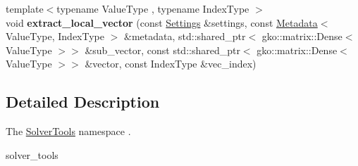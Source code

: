 \begin{DoxyCompactItemize}
\item 
\mbox{\label{namespaceSchwarzWrappers_1_1SolverTools_aaee0d8f44ffb632b4b58dad045c53b57}} 
{\footnotesize template$<$typename Value\+Type , typename Index\+Type $>$ }\\void {\bfseries extract\+\_\+local\+\_\+vector} (const \hyperlink{structSchwarzWrappers_1_1Settings}{Settings} \&settings, const \hyperlink{structSchwarzWrappers_1_1Metadata}{Metadata}$<$ Value\+Type, Index\+Type $>$ \&metadata, std\+::shared\+\_\+ptr$<$ gko\+::matrix\+::\+Dense$<$ Value\+Type $>$$>$ \&sub\+\_\+vector, const std\+::shared\+\_\+ptr$<$ gko\+::matrix\+::\+Dense$<$ Value\+Type $>$$>$ \&vector, const Index\+Type \&vec\+\_\+index)
\end{DoxyCompactItemize}


\subsection{Detailed Description}
The \hyperlink{namespaceSchwarzWrappers_1_1SolverTools}{Solver\+Tools} namespace . 

solver\+\_\+tools 